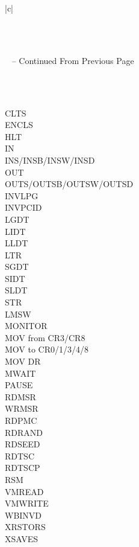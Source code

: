 \documentclass{report}
\begin{document}
\begin{spacing}{1.5}
{\begin{longtable}{|c|}
\caption{Instructions that could cause conditional VM-exits as defined by the VM-exit control section of the VMCS} \label{tab:long} \\

\hline {} \\ \hline 
\endfirsthead

%
{{\tablename\ \thetable{} -- Continued From Previous Page}} \\
\hline {} \\ \hline 
\endhead

\hline {} \\ \hline
\endfoot

\hline \hline
\endlastfoot

\large{CLTS} \\
\large{ENCLS} \\
\large{HLT} \\
\large{IN } \\
\large{INS/INSB/INSW/INSD } \\
\large{OUT} \\
\large{OUTS/OUTSB/OUTSW/OUTSD} \\
\large{INVLPG } \\
\large{INVPCID} \\
\large{LGDT} \\
\large{LIDT} \\
\large{LLDT} \\
\large{LTR} \\
\large{SGDT} \\
\large{SIDT} \\
\large{SLDT} \\
\large{STR} \\
\large{LMSW } \\
\large{MONITOR } \\
\large{MOV from CR3/CR8 } \\
\large{MOV to CR0/1/3/4/8 } \\
\large{MOV DR} \\
\large{MWAIT} \\
\large{PAUSE} \\
\large{RDMSR} \\
\large{WRMSR} \\
\large{RDPMC} \\
\large{RDRAND} \\
\large{RDSEED} \\
\large{RDTSC} \\
\large{RDTSCP} \\
\large{RSM} \\
\large{VMREAD} \\
\large{VMWRITE} \\
\large{WBINVD} \\
\large{XRSTORS} \\
\large{XSAVES} \\



\end{longtable}}
\end{spacing}
\end{document}
